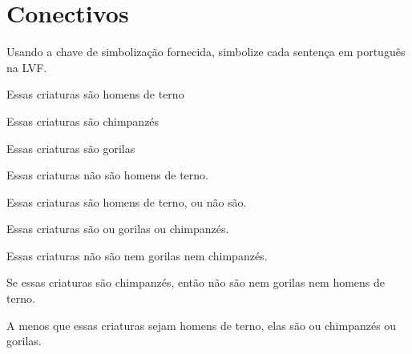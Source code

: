 


\chapter{Conectivos}\setcounter{ProbPart}{0}
\problempart Usando a chave de simbolização fornecida, simbolize cada sentença em português na LVF.\label{pr.monkeysuits}
	\begin{ekey}
		\item[M] Essas criaturas são homens de terno
		\item[C] Essas criaturas são chimpanzés
		\item[G] Essas criaturas são gorilas
	\end{ekey}
\begin{compactlist}
\item Essas criaturas não são homens de terno.
\item[] 
\item Essas criaturas são homens de terno, ou não são.
\item[] 
\item Essas criaturas são ou gorilas ou chimpanzés.
\item[] 
\item Essas criaturas não são nem gorilas nem chimpanzés.
\item[] 
\item Se essas criaturas são chimpanzés, então não são nem gorilas nem homens de terno.
\item[] 
\item A menos que essas criaturas sejam homens de terno, elas são ou chimpanzés ou gorilas.
\item[] 
\end{compactlist}

